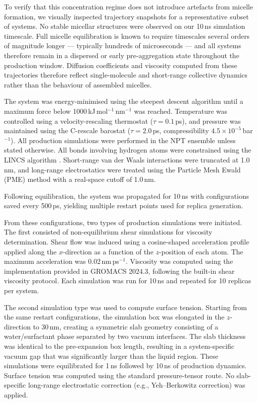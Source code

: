 \documentclass[11pt]{aime}
\begin{document}
To verify that this concentration regime does not introduce artefacts from micelle formation, we visually inspected trajectory snapshots for a representative subset of systems.
No stable micellar structures were observed on our 10\,ns simulation timescale.
Full micelle equilibration is known to require timescales several orders of magnitude longer --- typically hundreds of microseconds --- and all systems therefore remain in a dispersed or early pre-aggregation state throughout the production window.
Diffusion coefficients and viscosity computed from these trajectories therefore reflect single-molecule and short-range collective dynamics rather than the behaviour of assembled micelles.

The system was energy-minimised using the steepest descent algorithm until a maximum force below 1000\,kJ\,mol$^{-1}$\,nm$^{-1}$ was reached.
Temperature was controlled using a velocity-rescaling thermostat ($\tau = 0.1$\,ps), and pressure was maintained using the C-rescale barostat ($\tau = 2.0$\,ps, compressibility $4.5 \times 10^{-5}$\,bar$^{-1}$).
All production simulations were performed in the NPT ensemble unless stated otherwise.
All bonds involving hydrogen atoms were constrained using the LINCS algorithm \cite{hess_lincs_1997}.
Short-range van der Waals interactions were truncated at 1.0\,nm, and long-range electrostatics were treated using the Particle Mesh Ewald (PME) method with a real-space cutoff of 1.0\,nm.

Following equilibration, the system was propagated for 10\,ns with configurations saved every 500\,ps, yielding multiple restart points used for replica generation.

From these configurations, two types of production simulations were initiated.
The first consisted of non-equilibrium shear simulations for viscosity determination.
Shear flow was induced using a cosine-shaped acceleration profile applied along the $x$-direction as a function of the $z$-position of each atom.
The maximum acceleration was 0.02\,nm\,ps$^{-1}$.
Viscosity was computed using the implementation provided in GROMACS 2024.3, following the built-in shear viscosity protocol.
Each simulation was run for 10\,ns and repeated for 10 replicas per system.

The second simulation type was used to compute surface tension.
Starting from the same restart configurations, the simulation box was elongated in the $z$-direction to 30\,nm, creating a symmetric slab geometry consisting of a water/surfactant phase separated by two vacuum interfaces.
The slab thickness was identical to the pre-expansion box length, resulting in a system-specific vacuum gap that was significantly larger than the liquid region.
These simulations were equilibrated for 1\,ns followed by 10\,ns of production dynamics.
Surface tension was computed using the standard pressure-tensor route.
No slab-specific long-range electrostatic correction (e.g., Yeh--Berkowitz correction) was applied.
\end{document}
